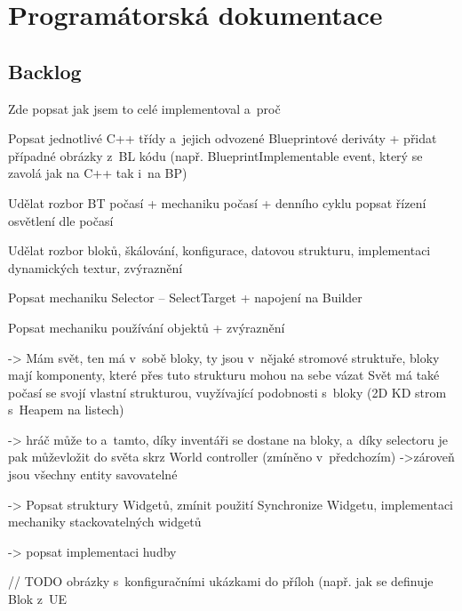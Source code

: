 
\chapter{Programátorská dokumentace}






\section{Backlog}

Zde popsat jak jsem to celé implementoval a~proč


Popsat jednotlivé C++ třídy a~jejich odvozené Blueprintové deriváty + přidat případné obrázky z~BL kódu (např. BlueprintImplementable event, který se zavolá jak na C++ tak i~na BP) 

Udělat rozbor BT počasí + mechaniku počasí + denního cyklu
popsat řízení osvětlení dle počasí

Udělat rozbor bloků, škálování, konfigurace, datovou strukturu, implementaci dynamických textur, zvýraznění

Popsat mechaniku Selector -- SelectTarget + napojení na Builder

Popsat mechaniku používání objektů + zvýraznění

-> Mám svět, ten má v~sobě bloky, ty jsou v~nějaké stromové struktuře, bloky mají komponenty, které přes tuto strukturu mohou na sebe vázat
Svět má také počasí se svojí vlastní strukturou, vuyžívající podobnosti s~bloky (2D KD strom s~Heapem na listech)

-> hráč může to a~tamto, díky inventáři se dostane na bloky, a~díky selectoru je pak můževložit do světa skrz World controller (zmíněno v~předchozím)
->zároveň jsou všechny entity savovatelné 


-> Popsat struktury Widgetů, zmínit použití Synchronize Widgetu, implementaci mechaniky stackovatelných widgetů

-> popsat implementaci hudby




// TODO obrázky s~konfiguračními ukázkami do příloh (např. jak se definuje Blok z~UE


